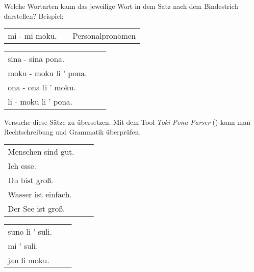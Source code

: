 Welche Wortarten kann das jeweilige Wort in dem Satz nach dem Bindestrich darstellen?
Beispiel: 

\begin{supertabular}{p{5,5cm}|ll}
mi - mi moku. && Personalpronomen \\ %
\end{supertabular}

\begin{supertabular}{p{5,5cm}|ll}
sina - sina pona. &&  \\ %
moku - moku li ' pona. &&  \\ %
ona - ona li ' moku. &&  \\ %
li - moku li ' pona. &&  \\ %
\end{supertabular}

Versuche diese Sätze zu übersetzen. 
Mit dem Tool \textit{Toki Pona Parser} (\cite{www:rowa:02}) kann man Rechtschreibung und Grammatik überprüfen. 

\begin{supertabular}{p{5,5cm}|ll}
Menschen sind gut. && \\ %
Ich esse. &&  \\ %
Du bist groß. &&  \\ %
Wasser ist einfach. &&  \\ %
Der See ist groß. && \\ %
\end{supertabular}

\begin{supertabular}{p{5,5cm}|ll}
suno li ' suli. &&  \\%
mi ' suli. &&  \\%
jan li moku. &&  \\%
\end{supertabular} \\%
%
